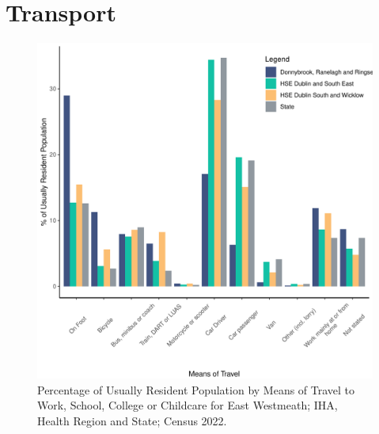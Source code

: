 \documentclass{article}
\begin{document}
\section{Transport}\label{sect:Trans}
\begin{figure}[H]
	\centering
	\includegraphics[width = 120mm]{../figures/TravelED.pdf}
	\caption{Percentage of Usually Resident Population by Means of Travel to Work, School, College or Childcare for East Westmeath; IHA, Health Region and State; Census 2022.}
	\label{fig:vbnv}
	\end{figure}
\end{document}
